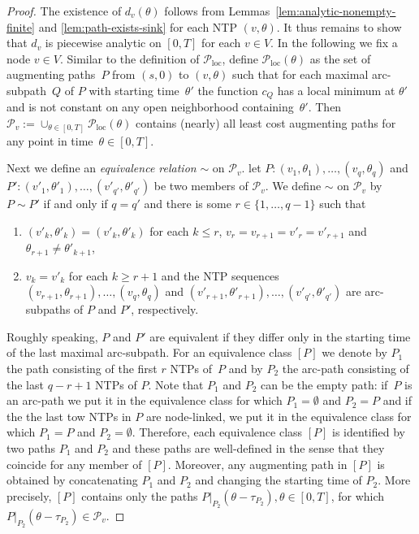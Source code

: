 \documentclass{svjour3}                     \smartqed
\newcommand{\loc}{\ensuremath{\text{loc}}}
\begin{document}
\begin{proof}
 The existence of $d_v(\theta)$ follows from Lemmas~\ref{lem:analytic-nonempty-finite} and \ref{lem:path-exists-sink} for each NTP $(v,\theta)$. It thus remains to show that $d_v$ is piecewise analytic on $[0,T]$ for each $v\in V$.  In the following we fix a node $v\in V$. Similar to the definition of $\mathcal{P}_{\loc}$, define $\mathcal{P}_{\loc}(\theta)$ as the set of augmenting paths~$P$ from $(s,0)$ to $(v,\theta)$ such that for each maximal arc-subpath~$Q$ of $P$ with starting time~$\theta'$ the function $c_{Q}$ has a local minimum at $\theta'$ and is not constant on any open neighborhood containing~$\theta'$. Then~$\mathcal{P}_v:=\cup_{\theta\in [0,T]} \mathcal{P}_{\loc}(\theta)$ contains (nearly) all least cost augmenting paths for any point in time~$\theta \in [0,T]$.

  Next we define an \emph{equivalence relation} $\sim$ on $\mathcal{P}_{v}$. let $P:(v_1,\theta_1),\ldots,(v_q,\theta_q)$ and $P':(v'_1,\theta'_1),\ldots,(v'_{q'},\theta'_{q'})$ be two members of $\mathcal{P}_v$. We define $\sim$ on $\mathcal{P}_{v}$ by $P\sim P'$ if and only if $q=q'$ and there is some $r\in \{1,\ldots,q-1\}$ such that
\begin{enumerate}[label = (\roman*)]
 \item $(v'_k,\theta'_k)=(v'_k,\theta'_k)$ for each $k\leq r$, $v_r=v_{r+1}=v'_{r}=v'_{r+1}$ and $\theta_{r+1}\neq \theta'_{k+1}$,
 \item $v_k=v'_k$ for each $k\geq r+1$ and the NTP sequences $(v_{r+1},\theta_{r+1}),\ldots,(v_q,\theta_q)$ and $(v'_{r+1},\theta'_{r+1}),\ldots,(v'_{q'},\theta'_{q'})$ are arc-subpaths of $P$ and $P'$, respectively.
\end{enumerate}

  Roughly speaking, $P$ and $P'$ are equivalent if they differ only in the starting time of the last maximal arc-subpath. For an equivalence class $[P]$ we denote by $P_1$ the path consisting of the first $r$ NTPs of~$P$ and by $P_2$ the arc-path consisting of the last $q-r+1$ NTPs of $P$. Note that $P_1$ and $P_2$ can be the empty path: if~$P$ is an arc-path we put it in the equivalence class for which $P_1=\emptyset$ and $P_2=P$ and if the the last tow NTPs in $P$ are node-linked, we put it in the equivalence class for which $P_1=P$ and $P_2=\emptyset$. Therefore, each equivalence class $[P]$ is identified by two paths $P_1$ and $P_2$ and these paths are well-defined in the sense that they coincide for any member of $[P]$. Moreover, any augmenting path in $[P]$ is obtained by concatenating $P_1$ and $P_2$ and changing the starting time of $P_2$. More precisely, $[P]$ contains only the paths $P|_{P_2}(\theta-\tau_{P_2}), \theta\in [0,T]$, for which $P|_{P_2}(\theta-\tau_{P_2})\in \mathcal{P}_v$. 


\end{proof}
\end{document}
